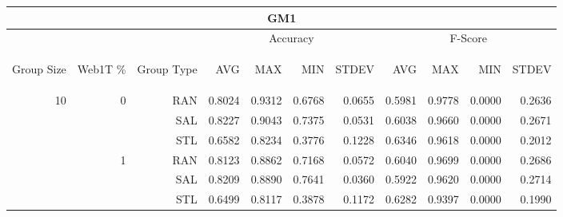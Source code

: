 \begin{center}
\begin{table}[htbp]
\begin{tabular}{ | r | r | r | r | r | r | r | r | r | r | r |}
\hline
\multicolumn{11}{|c|}{GM1}\\
\hline
 & & & \multicolumn{4}{|c|}{Accuracy} & \multicolumn{4}{|c|}{F-Score}\\ \cline{4-11}
\begin{sideways}Group Size\end{sideways} & \begin{sideways}Web1T \%\end{sideways} & \begin{sideways}Group Type\end{sideways} & \begin{sideways}AVG\end{sideways} & \begin{sideways}MAX\end{sideways} & \begin{sideways}MIN\end{sideways} & \begin{sideways}STDEV\end{sideways} & \begin{sideways}AVG\end{sideways} & \begin{sideways}MAX\end{sideways} & \begin{sideways}MIN\end{sideways} & \begin{sideways}STDEV\end{sideways}\\
\hline
\multirow{18}{*}{10}
 & \multirow{3}{*}{0} & RAN & 0.8024 & 0.9312 & 0.6768 & 0.0655 & 0.5981 & 0.9778 & 0.0000 & 0.2636\\ \cline{3-11}
 &   & SAL & 0.8227 & 0.9043 & 0.7375 & 0.0531 & 0.6038 & 0.9660 & 0.0000 & 0.2671\\ \cline{3-11}
 &   & STL & 0.6582 & 0.8234 & 0.3776 & 0.1228 & 0.6346 & 0.9618 & 0.0000 & 0.2012\\ \cline{2-11}
 & \multirow{3}{*}{1} & RAN & 0.8123 & 0.8862 & 0.7168 & 0.0572 & 0.6040 & 0.9699 & 0.0000 & 0.2686\\ \cline{3-11}
 &   & SAL & 0.8209 & 0.8890 & 0.7641 & 0.0360 & 0.5922 & 0.9620 & 0.0000 & 0.2714\\ \cline{3-11}
 &   & STL & 0.6499 & 0.8117 & 0.3878 & 0.1172 & 0.6282 & 0.9397 & 0.0000 & 0.1990\\ \cline{2-11}

\end{tabular}
\end{table}
\end{center}
